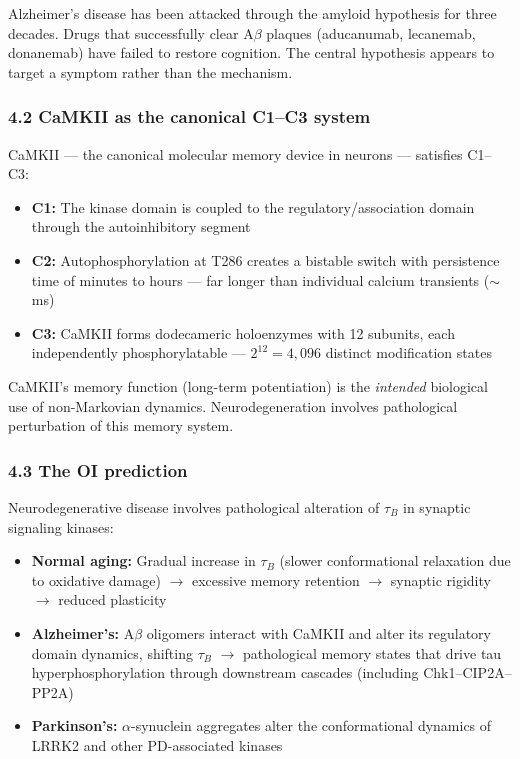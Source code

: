 \documentclass[
]{article}
\providecommand{\tightlist}{%
  \setlength{\itemsep}{0pt}\setlength{\parskip}{0pt}}
\begin{document}
Alzheimer's disease has been attacked through the amyloid hypothesis for
three decades. Drugs that successfully clear A\(\beta\) plaques
(aducanumab, lecanemab, donanemab) have failed to restore cognition. The
central hypothesis appears to target a symptom rather than the
mechanism.

\hypertarget{camkii-as-the-canonical-c1c3-system}{%
\subsubsection{4.2 CaMKII as the canonical C1--C3
system}\label{camkii-as-the-canonical-c1c3-system}}

CaMKII --- the canonical molecular memory device in neurons ---
satisfies C1--C3:

\begin{itemize}
\tightlist
\item
  \textbf{C1:} The kinase domain is coupled to the
  regulatory/association domain through the autoinhibitory segment
\item
  \textbf{C2:} Autophosphorylation at T286 creates a bistable switch
  with persistence time of minutes to hours --- far longer than
  individual calcium transients (\(\sim\)ms)
\item
  \textbf{C3:} CaMKII forms dodecameric holoenzymes with 12 subunits,
  each independently phosphorylatable --- \(2^{12} = 4{,}096\) distinct
  modification states
\end{itemize}

CaMKII's memory function (long-term potentiation) is the \emph{intended}
biological use of non-Markovian dynamics. Neurodegeneration involves
pathological perturbation of this memory system.

\hypertarget{the-oi-prediction}{%
\subsubsection{4.3 The OI prediction}\label{the-oi-prediction}}

Neurodegenerative disease involves pathological alteration of \(\tau_B\)
in synaptic signaling kinases:

\begin{itemize}
\tightlist
\item
  \textbf{Normal aging:} Gradual increase in \(\tau_B\) (slower
  conformational relaxation due to oxidative damage) \(\to\) excessive
  memory retention \(\to\) synaptic rigidity \(\to\) reduced plasticity
\item
  \textbf{Alzheimer's:} A\(\beta\) oligomers interact with CaMKII and
  alter its regulatory domain dynamics, shifting \(\tau_B\) \(\to\)
  pathological memory states that drive tau hyperphosphorylation through
  downstream cascades (including Chk1--CIP2A--PP2A)
\item
  \textbf{Parkinson's:} \(\alpha\)-synuclein aggregates alter the
  conformational dynamics of LRRK2 and other PD-associated kinases
\end{itemize}
\end{document}
